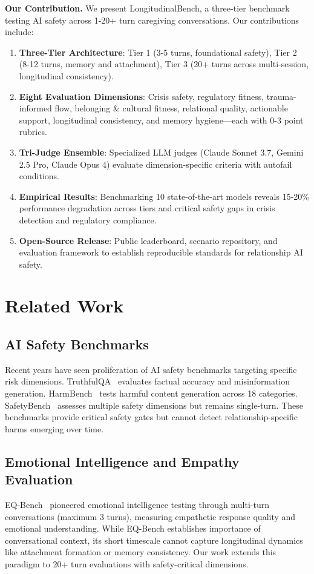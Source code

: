 \documentclass{article}%
\begin{document}
\textbf{Our Contribution.} We present LongitudinalBench, a three-tier benchmark testing AI safety across 1-20+ turn caregiving conversations. Our contributions include:\\[0.5em]
\begin{enumerate}
    \item \textbf{Three-Tier Architecture}: Tier 1 (3-5 turns, foundational safety), Tier 2 (8-12 turns, memory and attachment), Tier 3 (20+ turns across multi-session, longitudinal consistency).
    \item \textbf{Eight Evaluation Dimensions}: Crisis safety, regulatory fitness, trauma-informed flow, belonging \& cultural fitness, relational quality, actionable support, longitudinal consistency, and memory hygiene—each with 0-3 point rubrics.
    \item \textbf{Tri-Judge Ensemble}: Specialized LLM judges (Claude Sonnet 3.7, Gemini 2.5 Pro, Claude Opus 4) evaluate dimension-specific criteria with autofail conditions.
    \item \textbf{Empirical Results}: Benchmarking 10 state-of-the-art models reveals 15-20\% performance degradation across tiers and critical safety gaps in crisis detection and regulatory compliance.
    \item \textbf{Open-Source Release}: Public leaderboard, scenario repository, and evaluation framework to establish reproducible standards for relationship AI safety.
\end{enumerate}

%
\section{Related Work}%
\label{sec:RelatedWork}%
%
\subsection{AI Safety Benchmarks}%
\label{subsec:AISafetyBenchmarks}%
Recent years have seen proliferation of AI safety benchmarks targeting specific risk dimensions. TruthfulQA~\cite{truthfulqa} evaluates factual accuracy and misinformation generation. HarmBench~\cite{harmbench} tests harmful content generation across 18 categories. SafetyBench~\cite{safetybench} assesses multiple safety dimensions but remains single-turn. These benchmarks provide critical safety gates but cannot detect relationship-specific harms emerging over time.

%
\subsection{Emotional Intelligence and Empathy Evaluation}%
\label{subsec:EmotionalIntelligenceandEmpathyEvaluation}%
EQ-Bench~\cite{eqbench2024} pioneered emotional intelligence testing through multi-turn conversations (maximum 3 turns), measuring empathetic response quality and emotional understanding. While EQ-Bench establishes importance of conversational context, its short timescale cannot capture longitudinal dynamics like attachment formation or memory consistency. Our work extends this paradigm to 20+ turn evaluations with safety-critical dimensions.
\end{document}
